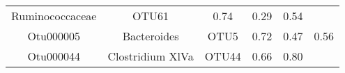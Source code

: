\documentclass[12pt,]{article}
\begin{document}
\begin{longtable}[]{@{}cccccc@{}}
\begin{minipage}[t]{0.17\columnwidth}
Ruminococcaceae\strut
\end{minipage} & \begin{minipage}[t]{0.15\columnwidth}\centering\strut
OTU61\strut
\end{minipage} & \begin{minipage}[t]{0.22\columnwidth}\centering\strut
0.74\strut
\end{minipage} & \begin{minipage}[t]{0.17\columnwidth}\centering\strut
0.29\strut
\end{minipage} & \begin{minipage}[t]{0.04\columnwidth}\centering\strut
0.54\strut
\end{minipage}\tabularnewline
\begin{minipage}[t]{0.08\columnwidth}\centering\strut
Otu000005\strut
\end{minipage} & \begin{minipage}[t]{0.17\columnwidth}\centering\strut
Bacteroides\strut
\end{minipage} & \begin{minipage}[t]{0.15\columnwidth}\centering\strut
OTU5\strut
\end{minipage} & \begin{minipage}[t]{0.22\columnwidth}\centering\strut
0.72\strut
\end{minipage} & \begin{minipage}[t]{0.17\columnwidth}\centering\strut
0.47\strut
\end{minipage} & \begin{minipage}[t]{0.04\columnwidth}\centering\strut
0.56\strut
\end{minipage}\tabularnewline
\begin{minipage}[t]{0.08\columnwidth}\centering\strut
Otu000044\strut
\end{minipage} & \begin{minipage}[t]{0.17\columnwidth}\centering\strut
Clostridium XlVa\strut
\end{minipage} & \begin{minipage}[t]{0.15\columnwidth}\centering\strut
OTU44\strut
\end{minipage} & \begin{minipage}[t]{0.22\columnwidth}\centering\strut
0.66\strut
\end{minipage} & \begin{minipage}[t]{0.17\columnwidth}\centering\strut
0.80\strut
\end{minipage} & \begin{minipage}[t]{0.04\columnwidth}\centering\strut

\end{minipage}
\end{longtable}
\end{document}
